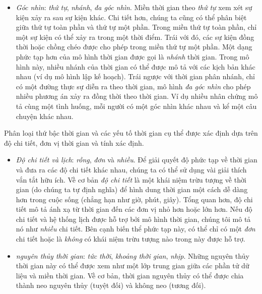 \begin{itemize}
    \item \textit{Góc nhìn}: \textit{thứ tự}, \textit{nhánh}, \textit{đa góc nhìn}. Miền thời gian theo \textit{thứ tự} xem xét sự kiện xảy ra sau sự kiện khác. Chi tiết hơn, chúng ta cũng có thể phân biệt giữa thứ tự toàn phần và thứ tự một phần. Trong miền thứ tự toàn phần, chỉ một sự kiện có thể xảy ra trong một thời điểm. Trái với đó, các sự kiện đồng thời hoặc chồng chéo được cho phép trong miền thứ tự một phần. Một dạng phức tạp hơn của mô hình thời gian được gọi là \textit{nhánh} thời gian. Trong mô hình này, nhiều nhánh của thời gian có thể được mô tả với các kịch bản khác nhau (ví dụ mô hình lập kế hoạch). Trái ngược với thời gian phân nhánh, chỉ có một đường thực sự diễn ra theo thời gian, mô hình \textit{đa góc nhìn} cho phép nhiều phương án xảy ra đồng thời theo thời gian. Ví dụ nhiều nhân chứng mô tả cùng một tình huống, mỗi người có một góc nhìn khác nhau và kể một câu chuyện khác nhau.
\end{itemize}
Phân loại thứ bậc thời gian và các yếu tố thời gian cụ thể được xác định dựa trên độ chi tiết, đơn vị thời gian và tính xác định.
\begin{itemize}
    \item \textit{Độ chi tiết và lịch}: \textit{rỗng}, \textit{đơn} và \textit{nhiều}. Để giải quyết độ phức tạp về thời gian và đưa ra các độ chi tiết khác nhau, chúng ta có thể sử dụng vài giải thích vắn tắt hữu ích. Về cơ bản \textit{độ chi tiết} là một khái niệm trừu tượng về thời gian (do chúng ta tự định nghĩa) để hình dung thời gian một cách dễ dàng hơn trong cuộc sống (chẳng hạn như giờ, phút, giây). Tổng quan hơn, độ chi tiết mô tả ánh xạ từ thời gian đến các đơn vị nhỏ hơn hoặc lớn hơn. Nếu độ chi tiết và hệ thống lịch được hỗ trợ bởi mô hình thời gian, chúng tôi mô tả nó như \textit{nhiều} chi tiết. Bên cạnh biến thể phức tạp này, có thể chỉ có một \textit{đơn} chi tiết hoặc là \textit{không} có khái niệm trừu tượng nào trong này được hỗ trợ.
    \item \textit{nguyên thủy thời gian}: \textit{tức thời}, \textit{khoảng thời gian}, \textit{nhịp}. Những nguyên thủy thời gian này có thể được xem như một lớp trung gian giữa các phần tử dữ liệu và miền thời gian. Về cơ bản, thời gian nguyên thủy có thể được chia thành neo nguyên thủy (tuyệt đối) và không neo (tương đối).
\end{itemize}
